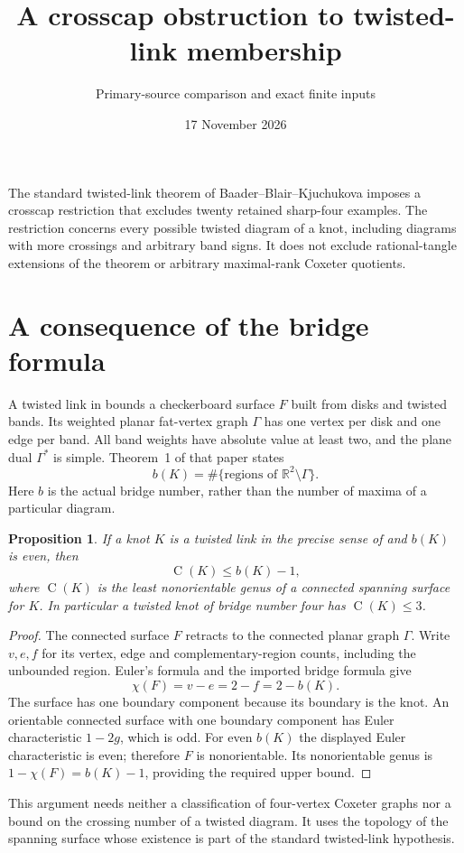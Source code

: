 \documentclass[11pt]{article}
\title{A crosscap obstruction to twisted-link membership}
\author{Primary-source comparison and exact finite inputs}
\date{17 November 2026}
\newtheorem{proposition}{Proposition}
\newcommand{\C}{\operatorname{C}}
\begin{document}
\maketitle

The standard twisted-link theorem of Baader--Blair--Kjuchukova imposes
a crosscap restriction that excludes twenty retained sharp-four examples.
The restriction concerns every possible twisted diagram of a knot,
including diagrams with more crossings and arbitrary band signs.
It does not exclude rational-tangle extensions of the theorem or
arbitrary maximal-rank Coxeter quotients.

\section{A consequence of the bridge formula}

A twisted link in \cite{bbk} bounds a checkerboard surface $F$ built from
disks and twisted bands. Its weighted planar fat-vertex graph $\Gamma$
has one vertex per disk and one edge per band. All band weights have
absolute value at least two, and the plane dual $\Gamma^*$ is simple.
Theorem~1 of that paper states
\[
 b(K)=\#\{\text{regions of }\mathbb R^2\setminus\Gamma\}.
\]
Here $b$ is the actual bridge number, rather than the number of
maxima of a particular diagram.

\begin{proposition}\label{prop:crosscap}
If a knot $K$ is a twisted link in the precise sense of \cite{bbk}
and $b(K)$ is even, then
\[
                         \C(K)\le b(K)-1,
\]
where $\C(K)$ is the least nonorientable genus of a connected spanning
surface for $K$. In particular a twisted knot of bridge number four
has $\C(K)\le3$.
\end{proposition}
\begin{proof}
The connected surface $F$ retracts to the connected planar graph
$\Gamma$. Write $v,e,f$ for its vertex, edge and complementary-region
counts, including the unbounded region. Euler's formula and the
imported bridge formula give
\[
 \chi(F)=v-e=2-f=2-b(K).
\]
The surface has one boundary component because its boundary is the knot.
An orientable connected surface with one boundary component has
Euler characteristic $1-2g$, which is odd.
For even $b(K)$ the displayed Euler characteristic is even;
therefore $F$ is nonorientable.
Its nonorientable genus is
$1-\chi(F)=b(K)-1$, providing the required upper bound.
\end{proof}

This argument needs neither a classification of four-vertex Coxeter
graphs nor a bound on the crossing number of a twisted diagram.
It uses the topology of the spanning surface whose existence is part
of the standard twisted-link hypothesis.
\end{document}
